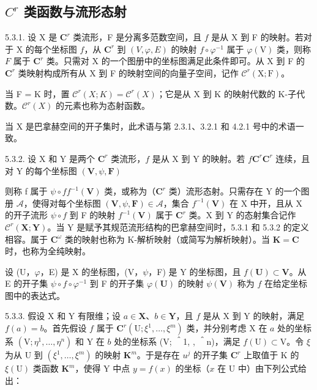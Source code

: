 \subsection{\texorpdfstring{\(C^{r}\) 类函数与流形态射}{C\^{}\{r\} 类函数与流形态射}}

5.3.1. 设 X 是 \(\mathbf{C}^{r}\) 类流形，F 是分离多范数空间，且 \(f\) 是从 X 到 F 的映射。若对于 X 的每个坐标图 \(f\)，从 \(\mathbf{C}^{r}\) 到 \((V, \varphi, E)\) 的映射 \(f\circ\varphi^{-1}\) 属于 \(\varphi(\mathrm V)\) 类，则称 \(F\) 属于 \(\mathbf{C}^{r}\) 类。只需对 X 的一个图册中的坐标图满足此条件即可。从 X 到 F 的 \(\mathbf{C}^{r}\) 类映射构成所有从 X 到 F 的映射空间的向量子空间，记作 \(\mathcal{C}^{r}(\mathrm{X};\mathrm{F})\)。

当 F = K 时，置 \(\mathcal{C}^{r}(X;K)=\mathcal{C}^{r}(X)\)；它是从 X 到 K 的映射代数的 K-子代数。\(\mathcal{C}^{r}(X)\) 的元素也称为态射函数。

当 X 是巴拿赫空间的开子集时，此术语与第 2.3.1、3.2.1 和 4.2.1 号中的术语一致。

5.3.2. 设 X 和 Y 是两个 \(\mathbf{C}^{r}\) 类流形，\(f\) 是从 X 到 Y 的映射。若 \(f\)\(\mathbf{C}^{r}\)\(\mathbf{C}^{r}\) 连续，且对 Y 的每个坐标图 \((\mathbf{V},\psi ,\mathbf{F})\)

则称 f 属于 \(\psi \circ f\)\(f^{-1}(\mathbf{V})\) 类，或称为（\(\mathbf{C}^{r}\) 类）流形态射。只需存在 Y 的一个图册 \(\mathcal{A}\)，使得对每个坐标图 \((\mathbf{V}, \psi, \mathbf{F}) \in \mathcal{A}\)，集合 \(f^{-1}(\mathbf{V})\) 在 X 中开，且从 X 的开子流形 \(\psi \circ f\) 到 F 的映射 \(f^{-1}(\mathbf{V})\) 属于 \(\mathbf{C}^{r}\) 类。X 到 Y 的态射集合记作 \(\mathcal{C}^{r}(\mathbf{X}; \mathbf{Y})\)。当 Y 是赋予其规范流形结构的巴拿赫空间时，5.3.1 和 5.3.2 的定义相容。属于 \(\mathbf{C}^{\omega}\) 类的映射也称为 K-解析映射（或简写为解析映射）。当 \(\mathbf{K} = \mathbf{C}\) 时，也称为全纯映射。

设 (U，\(\varphi\)，E) 是 X 的坐标图，(V，\(\psi\)，F) 是 Y 的坐标图，且 \(f(\mathbf{U}) \subset \mathbf{V}\)。从 E 的开子集 \(\psi \circ f \circ \varphi^{-1}\) 到 F 的开子集 \(\varphi(\mathbf{U})\) 的映射 \(\psi(\mathbf{V})\) 称为 \(f\) 在给定坐标图中的表达式。

5.3.3. 假设 X 和 Y 有限维；设 \(a \in \mathbf{X}\)、\(b \in \mathbf{Y}\)，且 \(f\) 是从 X 到 Y 的映射，满足 \(f(a) = b\)。首先假设 \(f\) 属于 \(\mathbf{C}^r\)\((\mathrm{U}; \xi^1, \ldots, \xi^m)\) 类，并分别考虑 X 在 \(a\) 处的坐标系 \((\mathrm{V}; \eta^1, \ldots, \eta^n)\) 和 Y 在 \(b\) 处的坐标系 (V; ＾1, , ＾n)，满足 \(f(\mathrm{U}) \subset \mathrm{V}\)。令 \(\xi\) 为从 U 到 \((\xi^1, \ldots, \xi^m)\) 的映射 \(\mathbf{K}^m\)。于是存在 \(u^j\) 的开子集 \(\mathbf{C}^r\) 上取值于 K 的 \(\xi(\mathrm{U})\) 类函数 \(\mathbf{K}^m\)，使得 Y 中点 \(y = f(x)\) 的坐标（\(x\) 在 U 中）由下列公式给出：

